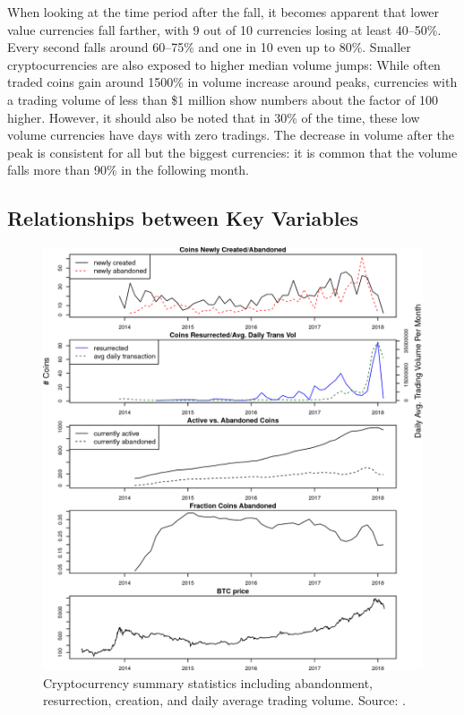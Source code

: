 \documentclass[11pt,a4paper,compsoc,conference]{IEEEtran}
\begin{document}
When looking at the time period after the fall, it becomes apparent that lower value currencies fall farther, with 9 out of 10 currencies losing at least 40--50\%. Every second falls around 60--75\% and one in 10 even up to 80\%. Smaller cryptocurrencies are also exposed to higher median volume jumps: While often traded coins gain around 1500\% in volume increase around peaks, currencies with a trading volume of less than \$1 million  show numbers about the factor of 100 higher. However, it should also be noted that in 30\% of the time, these low volume currencies have days with zero tradings. The decrease in volume after the peak is consistent for all but the biggest currencies: it is common that the volume falls more than 90\% in the following month.

\subsection{Relationships between Key Variables}
\begin{figure}
    \centering
    \includegraphics[width=.9\linewidth,  draft=false]{figures/16-Figure9-1.png}
    \caption[Summary of statistics]{Cryptocurrency summary statistics including abandonment, resurrection, creation, and daily average trading volume. Source: \citep{Feder2018TheRA}. }
    \label{fig:relations}
\end{figure}
\end{document}
